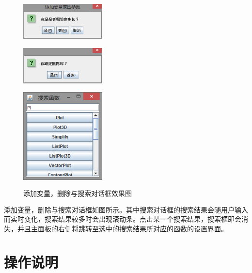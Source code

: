 \documentclass[hyperref, UTF8
,bookmarksnumbered=true, oneside]{ctexbook}
\begin{document}
			\begin{figure}[!h]
				\begin{minipage}[b]{0.3\textwidth}
				\centering
				\includegraphics[width=1.7in]{AddVR.png}
				\label{pic:MathPack}
				\end{minipage}%
				\hspace{0.025\textwidth}%
				\begin{minipage}[b]{0.3\textwidth}
				\centering
				\includegraphics[width=1.7in]{Delete.png}
				\label{pic:GUIPack}
				\end{minipage}			
				\hspace{0.025\textwidth}%
				\begin{minipage}[b]{0.3\textwidth}
				\centering
				\includegraphics[width=1.7in]{Search.png}
				\label{pic:GUIPack}
				\end{minipage}
				\caption{添加变量，删除与搜索对话框效果图}
			\end{figure}

			添加变量，删除与搜索对话框如图所示。其中搜索对话框的搜索结果会随用户输入而实时变化，搜索结果较多时会出现滚动条。点击某一个搜索结果，搜索框即会消失，并且主面板的右侧将跳转至选中的搜索结果所对应的函数的设置界面。
			

	
\chapter{操作说明}
\end{document}
